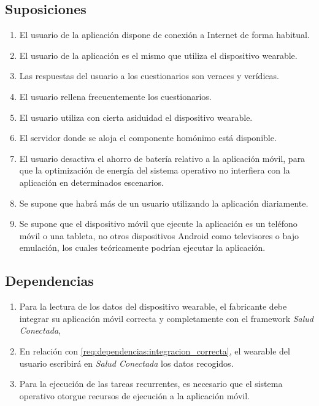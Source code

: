     \subsection{Suposiciones}
        
        \label{req:descripcion:suposiciones}

        \begin{enumerate}[label=\textbf{SUP-\arabic*}]
            \item El usuario de la aplicación dispone de conexión a Internet de forma habitual.
            \item El usuario de la aplicación es el mismo que utiliza el dispositivo \gls{wearable}.
            \item Las respuestas del usuario a los cuestionarios son veraces y verídicas.
            \item El usuario rellena frecuentemente los cuestionarios.
            \item El usuario utiliza con cierta asiduidad el dispositivo \gls{wearable}.
            \item El servidor donde se aloja el componente homónimo está disponible.
            \item El usuario desactiva el ahorro de batería relativo a la aplicación móvil, para que la optimización de energía del sistema operativo no interfiera con la aplicación en determinados escenarios.
            \item Se supone que habrá más de un usuario utilizando la aplicación diariamente.
            \item Se supone que el dispositivo móvil que ejecute la aplicación es un teléfono móvil o una tableta, no otros dispositivos Android como televisores o bajo emulación, los cuales teóricamente podrían ejecutar la aplicación.
        \end{enumerate}
        
    \subsection{Dependencias}
        \label{req:descripcion:dependencias}
        
        \begin{enumerate}[label=\textbf{DEP-\arabic*}]
            \item \label{req:dependencias:integracion_correcta} Para la lectura de los datos del dispositivo \gls{wearable}, el fabricante debe integrar su aplicación móvil correcta y completamente con el \gls{framework} \textit{Salud Conectada}, 
            \item En relación con \ref{req:dependencias:integracion_correcta}, el \gls{wearable} del usuario escribirá en \textit{Salud Conectada} los datos recogidos.
            \item Para la ejecución de las tareas recurrentes, es necesario que el sistema operativo otorgue recursos de ejecución a la aplicación móvil.
        \end{enumerate}

